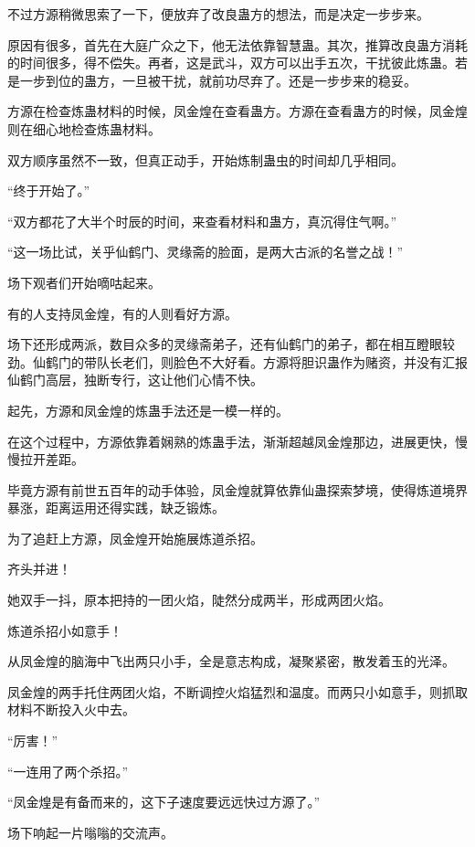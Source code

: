 \begin{this_body}
不过方源稍微思索了一下，便放弃了改良蛊方的想法，而是决定一步步来。

原因有很多，首先在大庭广众之下，他无法依靠智慧蛊。其次，推算改良蛊方消耗的时间很多，得不偿失。再者，这是武斗，双方可以出手五次，干扰彼此炼蛊。若是一步到位的蛊方，一旦被干扰，就前功尽弃了。还是一步步来的稳妥。

方源在检查炼蛊材料的时候，凤金煌在查看蛊方。方源在查看蛊方的时候，凤金煌则在细心地检查炼蛊材料。

双方顺序虽然不一致，但真正动手，开始炼制蛊虫的时间却几乎相同。

“终于开始了。”

“双方都花了大半个时辰的时间，来查看材料和蛊方，真沉得住气啊。”

“这一场比试，关乎仙鹤门、灵缘斋的脸面，是两大古派的名誉之战！”

场下观者们开始嘀咕起来。

有的人支持凤金煌，有的人则看好方源。

场下还形成两派，数目众多的灵缘斋弟子，还有仙鹤门的弟子，都在相互瞪眼较劲。仙鹤门的带队长老们，则脸色不大好看。方源将胆识蛊作为赌资，并没有汇报仙鹤门高层，独断专行，这让他们心情不快。

起先，方源和凤金煌的炼蛊手法还是一模一样的。

在这个过程中，方源依靠着娴熟的炼蛊手法，渐渐超越凤金煌那边，进展更快，慢慢拉开差距。

毕竟方源有前世五百年的动手体验，凤金煌就算依靠仙蛊探索梦境，使得炼道境界暴涨，距离运用还得实践，缺乏锻炼。

为了追赶上方源，凤金煌开始施展炼道杀招。

齐头并进！

她双手一抖，原本把持的一团火焰，陡然分成两半，形成两团火焰。

炼道杀招小如意手！

从凤金煌的脑海中飞出两只小手，全是意志构成，凝聚紧密，散发着玉的光泽。

凤金煌的两手托住两团火焰，不断调控火焰猛烈和温度。而两只小如意手，则抓取材料不断投入火中去。

“厉害！”

“一连用了两个杀招。”

“凤金煌是有备而来的，这下子速度要远远快过方源了。”

场下响起一片嗡嗡的交流声。

\end{this_body}

